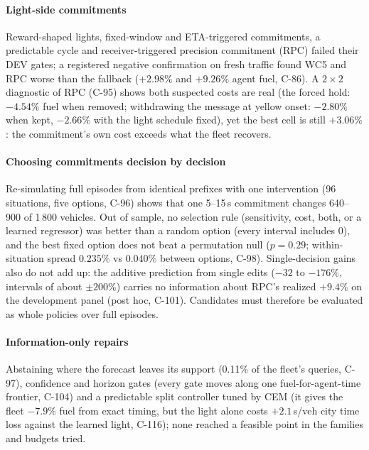 \paragraph{Light-side commitments} Reward-shaped lights, fixed-window and ETA-triggered commitments, a predictable cycle and
receiver-triggered precision commitment (RPC) failed their DEV gates; a registered negative confirmation on fresh traffic found WC5 and RPC worse than the fallback
($+2.98\%$ and $+9.26\%$ agent fuel, C-86). A $2\times2$ diagnostic of RPC (C-95) shows both suspected costs are real (the forced hold:
$-4.54\%$ fuel when removed; withdrawing the message at yellow onset: $-2.80\%$ when kept, $-2.66\%$ with the light schedule fixed), yet the best
cell is still $+3.06\%$: the commitment's own cost exceeds what the fleet recovers.
\paragraph{Choosing commitments decision by decision} Re-simulating full episodes from identical prefixes with one intervention
(96 situations, five options, C-96) shows that one 5--15\,s commitment changes 640--900 of 1\,800 vehicles. Out of sample, no selection
rule (sensitivity, cost, both, or a learned regressor) was better than a random option (every interval includes 0), and the best fixed option does not beat a permutation null
($p=0.29$; within-situation spread $0.235\%$ vs $0.040\%$ between options, C-98). Single-decision gains also do not add up: the
additive prediction from single edits ($-32$ to $-176\%$, intervals of about $\pm200\%$) carries no information about RPC's realized
$+9.4\%$ on the development panel (post hoc, C-101). Candidates must therefore be evaluated as
whole policies over full episodes.
\paragraph{Information-only repairs} Abstaining where the forecast leaves its support (0.11\% of the fleet's queries, C-97), confidence and
horizon gates (every gate moves along one fuel-for-agent-time frontier, C-104) and a predictable split controller tuned by CEM (it gives the
fleet $-7.9\%$ fuel from exact timing, but the light alone costs $+2.1$\,s/veh city time loss against the learned light, C-116); none
reached a feasible point in the families and budgets tried.


